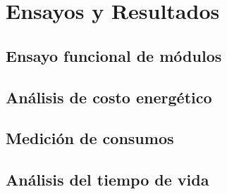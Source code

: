 
\chapter{Ensayos y Resultados} %

\label{Chapter4} %

\section{Ensayo funcional de módulos}
\label{sec:funcional}


\section{Análisis de costo energético}
\label{sec:Análisis de costo}

\section{Medición de consumos}
\label{sec:Medición}

\section{Análisis del tiempo de vida}
\label{sec:vida}

